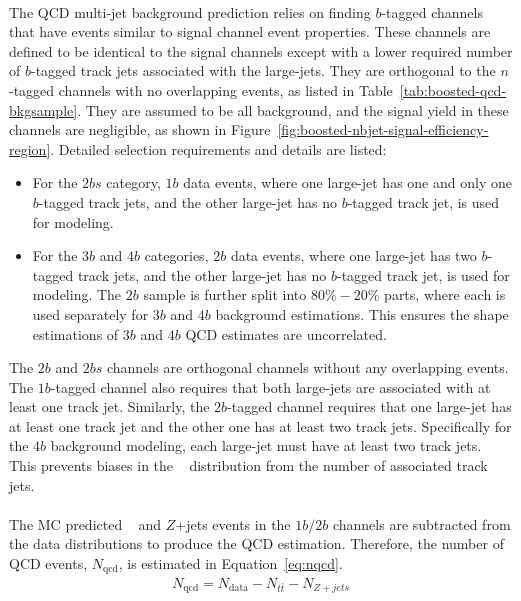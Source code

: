 \paragraph{}
The QCD multi-jet background prediction relies on finding $b$-tagged channels that have events similar to signal channel event properties.
These channels are defined to be identical to the signal channels except with a lower required number of $b$-tagged track jets associated with the large-\R jets.
They are orthogonal to the $n$-tagged channels with no overlapping events, as listed in Table~\ref{tab:boosted-qcd-bkgsample}.
They are assumed to be all background, and the signal yield in these channels are negligible, as shown in Figure~\ref{fig:boosted-nbjet-signal-efficiency-region}.
Detailed selection requirements and details are listed:
\begin{itemize}
  \item For the $2bs$ category, $1b$ data events, where one large-\R jet has one and only one $b$-tagged track jets, and the other large-\R jet has no $b$-tagged track jet, is used for modeling.
  \item For the $3b$ and $4b$ categories, $2b$ data events, where one large-\R jet has two $b$-tagged track jets, and the other large-\R jet has no $b$-tagged track jet, is used for modeling. The $2b$ sample is further split into $80\%-20\%$ parts, where each is used separately for $3b$ and $4b$ background estimations. This ensures the shape estimations of $3b$ and $4b$ QCD estimates are uncorrelated. 
\end{itemize}
The $2b$ and $2bs$ channels are orthogonal channels without any overlapping events.
The $1b$-tagged channel also requires that both large-\R jets are associated with at least one track jet. 
Similarly, the $2b$-tagged channel requires that one large-\R jet has at least one track jet and the other one has at least two track jets.  
Specifically for the $4b$ background modeling, each large-\R jet must have at least two track jets. 
This prevents biases in the \mtwoJ~ distribution from the number of associated track jets.

\paragraph{}
The MC predicted \ttbar~ and $Z$+jets events in the $1b/2b$ channels are subtracted from the data distributions to produce the QCD estimation. 
Therefore, the number of QCD events, $N_{\text{qcd}}$, is estimated in Equation~\ref{eq:nqcd}.
\begin{eqnarray}
\label{eq:nqcd}
N_{\text{qcd}} = N_{\text{data}} - N_{t\bar{t}} - N_{Z+jets} 
\end{eqnarray}

